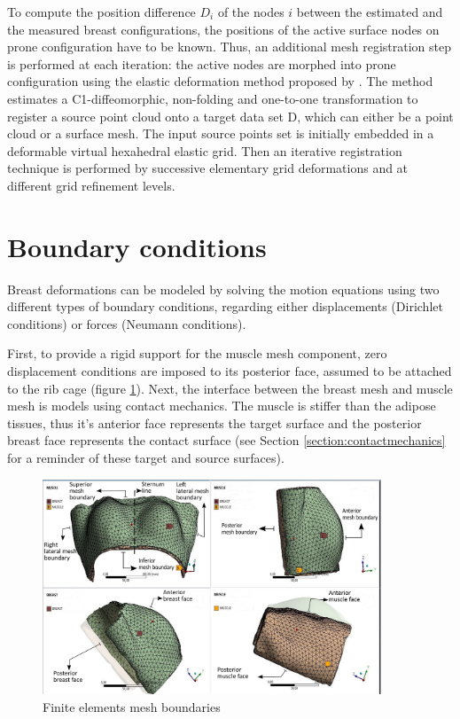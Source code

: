 To compute the position difference $D_i$ of the nodes $i$ between the estimated and the measured breast configurations, the  positions of the active surface nodes on prone configuration have to be known. Thus, an additional mesh registration step is performed at each iteration: the active nodes are morphed into prone configuration using the elastic deformation method proposed by \cite{bucki_fast_2010}. The method estimates a C1-diffeomorphic, non-folding and one-to-one transformation to register a source point cloud onto a target data set D, which can either be a point cloud or a surface mesh.  The input source points set is initially embedded in a deformable virtual hexahedral elastic grid. Then an iterative registration technique is performed by successive elementary grid deformations and at different grid refinement levels. 

\section{Boundary conditions}\label{section:myBoundayconditions}

Breast deformations can be modeled by solving the
motion equations using two different types of boundary
conditions, regarding either displacements (Dirichlet conditions) or forces (Neumann conditions).

First, to provide a rigid support for the muscle mesh component, zero displacement conditions are imposed to its posterior face, assumed to be attached to the rib cage (figure \ref{fig:meshboundaries}). Next, the interface between the breast mesh and muscle mesh is models using contact mechanics. The muscle is stiffer than the adipose tissues, thus it's anterior face represents the target surface and the posterior breast face represents the contact surface (see Section \ref{section:contactmechanics} for a reminder of these target and source surfaces). 

\begin{figure}[!h]
\centering
\includegraphics[width=0.9\textwidth,keepaspectratio]{figures/mesh_parts_2.png} 
\caption{Finite elements mesh boundaries}\label{fig:meshboundaries}
\end{figure}

